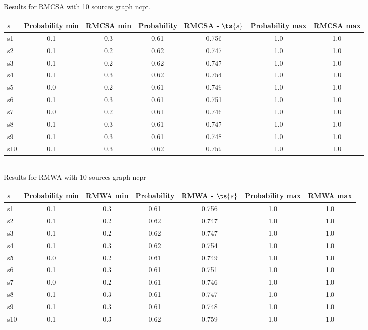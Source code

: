 \documentclass{article}
\begin{document}
\noindent Results for RMCSA with 10 sources graph ncpr.

\noindent\begin{tabular}{|l|c|c|c|c|c|c|}
\hline
$s$& Probability min & RMCSA min & Probability & RMCSA - $\ts{s}$ & Probability max & RMCSA max\\
\hline
s1 &0.1 & 0.3 & 0.61 & 0.756 & 1.0 & 1.0\\
\hline
s2 &0.1 & 0.2 & 0.62 & 0.747 & 1.0 & 1.0\\
\hline
s3 &0.1 & 0.2 & 0.62 & 0.747 & 1.0 & 1.0\\
\hline
s4 &0.1 & 0.3 & 0.62 & 0.754 & 1.0 & 1.0\\
\hline
s5 &0.0 & 0.2 & 0.61 & 0.749 & 1.0 & 1.0\\
\hline
s6 &0.1 & 0.3 & 0.61 & 0.751 & 1.0 & 1.0\\
\hline
s7 &0.0 & 0.2 & 0.61 & 0.746 & 1.0 & 1.0\\
\hline
s8 &0.1 & 0.3 & 0.61 & 0.747 & 1.0 & 1.0\\
\hline
s9 &0.1 & 0.3 & 0.61 & 0.748 & 1.0 & 1.0\\
\hline
s10 &0.1 & 0.3 & 0.62 & 0.759 & 1.0 & 1.0\\
\hline
\end{tabular}\\

\noindent Results for RMWA with 10 sources graph ncpr.

\noindent\begin{tabular}{|l|c|c|c|c|c|c|}
\hline
$s$& Probability min & RMWA min & Probability & RMWA - $\ts{s}$ & Probability max & RMWA max\\
\hline
s1 &0.1 & 0.3 & 0.61 & 0.756 & 1.0 & 1.0\\
\hline
s2 &0.1 & 0.2 & 0.62 & 0.747 & 1.0 & 1.0\\
\hline
s3 &0.1 & 0.2 & 0.62 & 0.747 & 1.0 & 1.0\\
\hline
s4 &0.1 & 0.3 & 0.62 & 0.754 & 1.0 & 1.0\\
\hline
s5 &0.0 & 0.2 & 0.61 & 0.749 & 1.0 & 1.0\\
\hline
s6 &0.1 & 0.3 & 0.61 & 0.751 & 1.0 & 1.0\\
\hline
s7 &0.0 & 0.2 & 0.61 & 0.746 & 1.0 & 1.0\\
\hline
s8 &0.1 & 0.3 & 0.61 & 0.747 & 1.0 & 1.0\\
\hline
s9 &0.1 & 0.3 & 0.61 & 0.748 & 1.0 & 1.0\\
\hline
s10 &0.1 & 0.3 & 0.62 & 0.759 & 1.0 & 1.0\\
\hline
\end{tabular}\\
\end{document}
